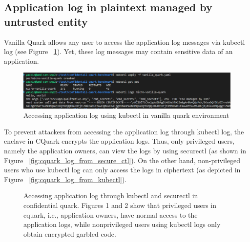 \subsection{Application log in plaintext managed by untrusted entity}
Vanilla Quark allows any user to access the application log messages via kubectl log (see Figure ~\ref{fig:vanilla_queak_app_log}). 
Yet, these log messages may contain sensitive data of an application.
\begin{figure}[H]
    \centering
    \includegraphics[width=1\textwidth]{images/vanilla_queak_app_log.png}
    \caption[Accessing application log using kubectl in vanilla quark environment]{Accessing application log using kubectl in vanilla quark environment}
    \label{fig:vanilla_queak_app_log}
\end{figure}

To prevent attackers from accessing the application log through kubectl log, the enclave in CQuark encrypts the application logs. Thus, only privileged users, namely the application owners, can view the logs by using securectl (as shown in Figure ~\ref{fig:cquark_log_from_secure_ctl}).
 On the other hand, non-privileged users who use kubectl log can only access the logs in ciphertext (as depicted in Figure ~\ref{fig:cquark_log_from_kubectl}).

\begin{figure}[H]

    
    
    \caption[Accessing application log through kubectl and securectl in confidential quark]{Accessing application log through kubectl and securectl in confidential quark. Figures 1 and 2 show that privileged users in cquark, i.e., 
    application owners, have normal access to the application logs, while non\-privileged users using kubectl logs only obtain encrypted garbled code.}
\end{figure}

